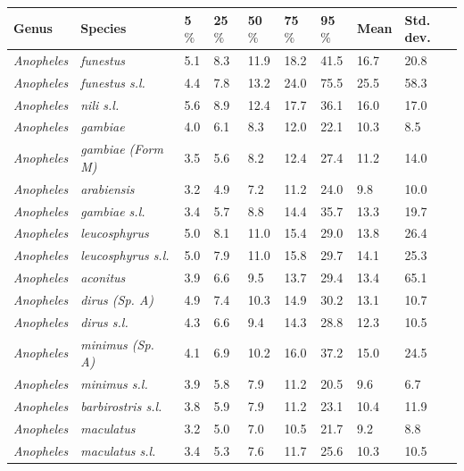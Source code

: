 \documentclass[12pt]{article}
\begin{document}
\begin{table}[htbp!]
\begin{tabular}{l|l|l|l|l|l|l|l|l}
	\textbf{Genus} & \textbf{Species} & \textbf{5$\%$} & \textbf{25$\%$} & \textbf{50$\%$} &
	\textbf{75$\%$} & \textbf{95$\%$} & \textbf{Mean} & \textbf{Std. dev.} \\
	\hline
	\textit{Anopheles} & \textit{funestus} & 5.1 & 8.3 & 11.9 & 18.2 & 41.5 & 16.7 & 20.8 \\
	\textit{Anopheles} & \textit{funestus s.l.} & 4.4 & 7.8 & 13.2 & 24.0 & 75.5 & 25.5 & 58.3
	\\
	\textit{Anopheles} & \textit{nili s.l.} & 5.6 & 8.9 & 12.4 & 17.7 & 36.1 & 16.0 & 17.0 \\
	\textit{Anopheles} & \textit{gambiae} & 4.0 & 6.1 & 8.3 & 12.0 & 22.1 & 10.3 & 8.5 \\
	\textit{Anopheles} & \textit{gambiae (Form M)} & 3.5 & 5.6 & 8.2 & 12.4 & 27.4 & 11.2 & 14.0
	\\
	\textit{Anopheles} & \textit{arabiensis} & 3.2 & 4.9 & 7.2 & 11.2 & 24.0 & 9.8 & 10.0 \\
	\textit{Anopheles} & \textit{gambiae s.l.} & 3.4 & 5.7 & 8.8 & 14.4 & 35.7 & 13.3 & 19.7 \\
	\textit{Anopheles} & \textit{leucosphyrus} & 5.0 & 8.1 & 11.0 & 15.4 & 29.0 & 13.8 & 26.4 \\
	\textit{Anopheles} & \textit{leucosphyrus s.l.} & 5.0 & 7.9 & 11.0 & 15.8 & 29.7 & 14.1 &
	25.3 \\
	\textit{Anopheles} & \textit{aconitus} & 3.9 & 6.6 & 9.5 & 13.7 & 29.4 & 13.4 & 65.1 \\
	\textit{Anopheles} & \textit{dirus (Sp. A)} & 4.9 & 7.4 & 10.3 & 14.9 & 30.2 & 13.1
	& 10.7 \\
	\textit{Anopheles} & \textit{dirus s.l.} & 4.3 & 6.6 & 9.4 & 14.3 & 28.8 & 12.3 & 10.5 \\
	\textit{Anopheles} & \textit{minimus (Sp. A)} & 4.1 & 6.9 & 10.2 & 16.0 & 37.2 &
	15.0 & 24.5 \\
	\textit{Anopheles} & \textit{minimus s.l.} & 3.9 & 5.8 & 7.9 & 11.2 & 20.5 & 9.6 & 6.7 \\
	\textit{Anopheles} & \textit{barbirostris s.l.} & 3.8 & 5.9 & 7.9 & 11.2 & 23.1 & 10.4 &
	11.9 \\
	\textit{Anopheles} & \textit{maculatus} & 3.2 & 5.0 & 7.0 & 10.5 & 21.7 & 9.2 & 8.8 \\
	\textit{Anopheles} & \textit{maculatus s.l.} & 3.4 & 5.3 & 7.6 & 11.7 & 25.6 & 10.3 & 10.5
	\\

\end{tabular}
\end{table}
\end{document}
